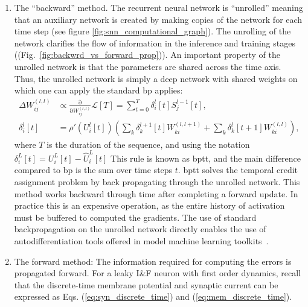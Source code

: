 \documentclass[journal,onecolumn,11pt]{IEEEtran}
\newcommand{\reffig}[1]{{\color{blue!70}(Fig.~\ref{#1})}}
\begin{document}
\begin{enumerate}
\item The ``backward'' method. The recurrent neural network is ``unrolled'' meaning that an auxiliary network is created by making copies of the network for each time step (see figure \ref{fig:snn_computational_graph}). 
The unrolling of the network clarifies the flow of information in the inference and training stages (\reffig{fig:backwrd_vs_forward_prop}).
An important property of the unrolled network is that the parameters are shared across the time axis.
    Thus, the unrolled network is simply a deep network with shared weights on which one can apply the standard \Gls{bp} applies:
%
\begin{equation}\label{eq:bp_deep}
  \begin{split}
    \Delta {W_{ij}^{(l,l)}} &\propto \frac{\mathrm{\partial}}{\mathrm{\partial} W^{(l,l)}_{ij}} \mathcal{L}[T]  = \sum_{t=0}^T \delta_{i}^{l}[t]  S^{l-1}_j[t],\\
    \delta_{i}^{l} [t] & = \rho'\left( U_i^l [t] \right) \left( \sum_k \delta_{k}^{l+1}[t] W_{ki}^{(l,l+1)} + \sum_k \delta_{k}^{l}[t+1] W_{ki}^{(l,l)} \right),
  \end{split}
\end{equation}
%
where $T$ is the duration of the sequence, and using the notation $\delta^{L}_i[t] = U_i^L[t]-\hat{U}_i^L[t]$
This rule is known as \gls{bptt}, and the main difference compared to \gls{bp} is the sum over time steps $t$.
\gls{bptt} solves the temporal credit assignment problem by back propagating through the unrolled network.
This method works backward through time after completing a forward update.
In practice this is an expensive operation, as the entire history of activation must be buffered to computed the gradients.
The use of standard backpropagation on the unrolled network directly enables the use of autodifferentiation tools offered in model machine learning toolkits~\cite{Bellec_etal18_longshor,Shrestha_Orchard18_slayspik,Wozniak_etal18_deepnetw}.\\
\item The forward method: The information required for computing the errors is propagated forward.
  For a leaky I\&F neuron with first order dynamics, recall that the discrete-time membrane potential and synaptic current can be expressed as Eqs. (\ref{eq:syn_discrete_time}) and (\ref{eq:mem_discrete_time}).

\end{enumerate}
\end{document}
